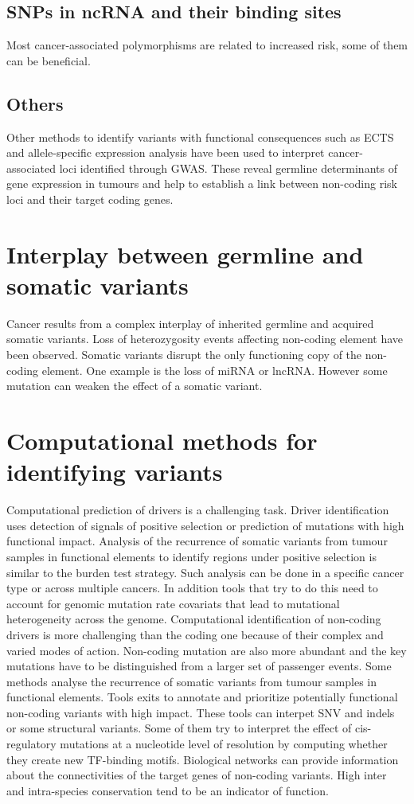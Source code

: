 	\subsection{SNPs in ncRNA and their binding sites}
	Most cancer-associated polymorphisms are related to increased risk, some of them can be beneficial.

	\subsection{Others}
	Other methods to identify variants with functional consequences such as ECTS and allele-specific expression analysis have been used to interpret cancer-associated loci identified through GWAS.
	These reveal germline determinants of gene expression in tumours and help to establish a link between non-coding risk loci and their target coding genes.

\section{Interplay between germline and somatic variants}
Cancer results from a complex interplay of inherited germline and acquired somatic variants.
Loss of heterozygosity events affecting non-coding element have been observed.
Somatic variants disrupt the only functioning copy of the non-coding element.
One example is the loss of miRNA or lncRNA.
However some mutation can weaken the effect of a somatic variant.

\section{Computational methods for identifying variants}
Computational prediction of drivers is a challenging task.
Driver identification uses detection of signals of positive selection or prediction of mutations with high functional impact.
Analysis of the recurrence of somatic variants from tumour samples in functional elements to identify regions under positive selection is similar to the burden test strategy.
Such analysis can be done in a specific cancer type or across multiple cancers.
In addition tools that try to do this need to account for genomic mutation rate covariats that lead to mutational heterogeneity across the genome.
Computational identification of non-coding drivers is more challenging than the coding one because of their complex and varied modes of action.
Non-coding mutation are also more abundant and the key mutations have to be distinguished from a larger set of passenger events.
Some methods analyse the recurrence of somatic variants from tumour samples in functional elements.
Tools exits to annotate and prioritize potentially functional non-coding variants with high impact.
These tools can interpet SNV and indels or some structural variants.
Some of them try to interpret the effect of cis-regulatory mutations at a nucleotide level of resolution by computing whether they create new TF-binding motifs.
Biological networks can provide information about the connectivities of the target genes of non-coding variants.
High inter and intra-species conservation tend to be an indicator of function.

